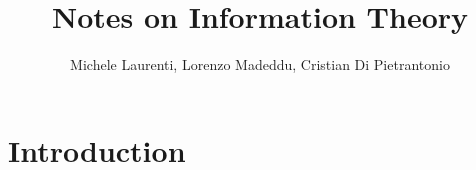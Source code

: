 \documentclass[a4paper, 11pt]{book}
\title{Notes on Information Theory}
\author{Michele Laurenti, Lorenzo Madeddu, Cristian Di Pietrantonio}
\begin{document}
	\maketitle
	
	\chapter{Introduction}
	
	
\end{document}
